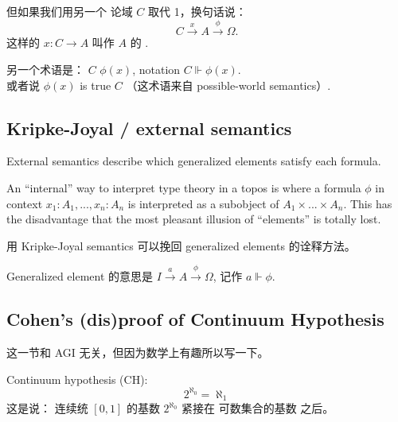 但如果我们用另一个 论域 $C$ 取代 1，换句话说：
\begin{equation}
C \stackrel{x}{\rightarrow} A \stackrel{\phi}{\rightarrow} \Omega.
\end{equation}
这样的 $x: C \rightarrow A$ 叫作 $A$ 的 .

另一个术语是： $C$  $\phi(x)$, notation $C \Vdash \phi(x)$. \\
或者说 $\phi(x)$ is true  $C$ （这术语来自 possible-world semantics）.

\subsection{Kripke-Joyal / external semantics}

External semantics describe which generalized elements satisfy each formula.

An ``internal'' way to interpret type theory in a topos is where a formula $\phi$ in context $x_1: A_1, ... , x_n: A_n$ is interpreted as a subobject of $A_1 \times ... \times A_n$.  This has the disadvantage that the most pleasant illusion of ``elements'' is totally lost.

用 Kripke-Joyal semantics 可以挽回 generalized elements 的诠释方法。 

Generalized element 的意思是 $I \stackrel{a}{\rightarrow} A \stackrel{\phi}{\rightarrow} \Omega$, 记作 $a \Vdash \phi$.

\subsection{Cohen's (dis)proof of Continuum Hypothesis}

这一节和 AGI 无关，但因为数学上有趣所以写一下。

Continuum hypothesis (CH):
\begin{equation}
2^{\aleph_0} = \aleph_1
\end{equation}
这是说： 连续统 $[0,1]$ 的基数 $2^{\aleph_0}$ 紧接在 可数集合的基数 之后。

